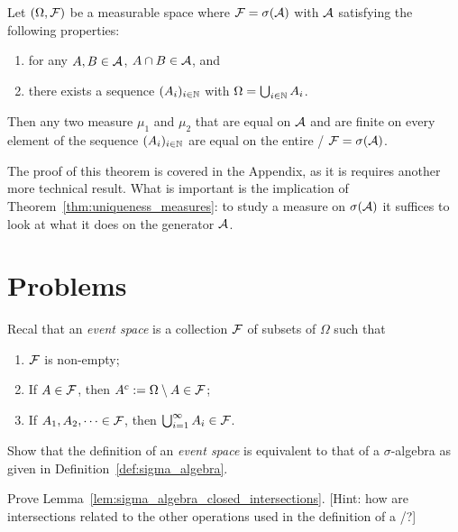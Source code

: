\begin{theorem}\label{thm:uniqueness_measures}
Let $(\Omega ,\mathcal F)$ be a measurable space where $\mathcal F = \sigma(\mathcal A)$ with $\mathcal A$ satisfying the following properties:
\begin{enumerate}
\item for any $A, B \in \mathcal A$, $A \cap B \in \mathcal A$, and
\item there exists a sequence $(A_i)_{i \in \mathbb N}$ with $\Omega = \bigcup_{i \in \mathbb N} A_i$.
\end{enumerate}
Then any two measure $\mu_1$ and $\mu_2$ that are equal on $\mathcal A$ and are finite on every element of the sequence $(A_i)_{i \in \mathbb N}$ are equal on the entire \sigalg/ $\mathcal F = \sigma(\mathcal A)$.
\end{theorem}

The proof of this theorem is covered in the Appendix, as it is requires another more technical result. What is important is the implication of Theorem~\ref{thm:uniqueness_measures}: to study a measure on $\sigma(\mathcal A)$ it suffices to look at what it does on the generator $\mathcal A$.



\section{Problems}

\begin{problem}\label{prb:event_space_are_sigma_algebras}
Recal that an \emph{event space} is a collection $\mathcal F$ of subsets of $\Omega$ such that
\begin{enumerate}
\item $\mathcal F$ is non-empty;
\item If $A \in \mathcal F$, then $A^c := \Omega \setminus A \in \mathcal F$;
\item If $A_1, A_2, \dots \in \mathcal F$, then $\bigcup_{i = 1}^\infty A_i \in \mathcal F$.
\end{enumerate}
Show that the definition of an \emph{event space} is equivalent to that of a $\sigma$-algebra as given in Definition~\ref{def:sigma_algebra}.
\end{problem}

\begin{problem}\label{prb:sigma_algebra_closed_intersections}
Prove Lemma~\ref{lem:sigma_algebra_closed_intersections}. [Hint: how are intersections related to the other operations used in the definition of a \sigalg/?]
\end{problem}

